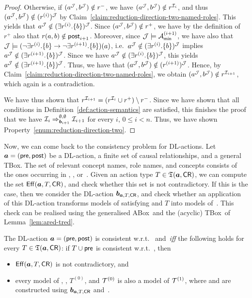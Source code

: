 \begin{proof}
    Otherwise, if $(a^\mathcal{J},b^\mathcal{J})\notin r^-$, we have
    $(a^\mathcal{J},b^\mathcal{J})\notin r^{\mathcal{I}_i}$, and thus
    $(a^\mathcal{J},b^\mathcal{J})\notin(r^{(i)})^\mathcal{J}$ by
    Claim~\ref{claim:reduction-direction-two-named-roles}.  This yields that
    $a^\mathcal{J}\notin(\exists r^{(i)}.\{b\})^\mathcal{J}$.  Since
    $(a^\mathcal{J},b^\mathcal{J})\notin r^+$, we have by the definition of~$r^+$ also that
    $r(a,b)\notin\mathsf{post}_{i+1}$.  Moreover, since $\mathcal{J}\models\mathcal{A}_\mathsf{min}^{(i+1)}$, we
    have also that
    $\mathcal{J}\models(\lnot\exists r^{(i)}.\{b\}\to\lnot\exists r^{(i+1)}.\{b\})(a)$,
    i.e.~$a^\mathcal{J}\notin(\exists r^{(i)}.\{b\})^\mathcal{J}$ implies
    $a^\mathcal{J}\notin(\exists r^{(i+1)}.\{b\})^\mathcal{J}$.  Since we have
    $a^\mathcal{J}\notin(\exists r^{(i)}.\{b\})^\mathcal{J}$, this yields
    $a^\mathcal{J}\notin(\exists r^{(i+1)}.\{b\})^\mathcal{J}$.  Thus, we have that
    $(a^\mathcal{J},b^\mathcal{J})\notin(r^{(i+1)})^\mathcal{J}$.  Hence, by
    Claim~\ref{claim:reduction-direction-two-named-roles}, we obtain
    $(a^\mathcal{J},b^\mathcal{J})\notin r^{\mathcal{I}_{i+1}}$, which again is a contradiction.

    We have thus shown that
    $r^{\mathcal{I}_{i+1}}=(r^{\mathcal{I}_i}\cup r^+)\setminus r^-$.
    Since we have shown that all conditions in Definition~\ref{def:action-semantics}
    are satisfied, this finishes the proof that we have
    $\mathcal{I}_i\Rightarrow_{\boldsymbol b_{i+1}}^{\emptyset,\emptyset}\mathcal{I}_{i+1}$ for every
    $i$, $0\le i<n$.  Thus, we have shown
    Property~\eqref{enum:reduction-direction-two}.
\end{proof}

\noindent
Now, we can come back to the consistency problem for DL-actions.  Let
$\boldsymbol a=(\mathsf{pre},\mathsf{post})$ be a DL-action, \CR a finite set of causal
relationships, and \Tmc a general TBox.  The set \Rmc of relevant concept names,
role names, and concepts consists of the ones occurring in \abf, \CR, or~\Tmc.
Given an action type $T\in\mathfrak{T}(\boldsymbol a,\mathsf{CR})$, we can compute the set
$\operatorname{\mathsf{Eff}}(\boldsymbol a,T,\mathsf{CR})$, and check whether this set is not contradictory.  If this is
the case, then we consider the DL-action $\boldsymbol b_{\boldsymbol a,T,\mathsf{CR}}$, and check whether
an application of this DL-action transforms models of \Tmc satisfying \pre and
$T$ into models of~\Tmc.  This check can be realised using the generalised
ABox~\Ared and the (acyclic) TBox~\Tred of Lemma~\ref{lem:ared-tred}.

\begin{lemma}\label{lem:consistency-tbox}
    The DL-action $\boldsymbol a=(\mathsf{pre},\mathsf{post})$ is consistent w.r.t.~\Tmc
    and~\CR \emph{iff} the following holds for every $T\in\mathfrak{T}(\boldsymbol a,\mathsf{CR})$: if
    $T\cup\mathsf{pre}$ is consistent w.r.t.~\Tmc, then
    \begin{itemize}
        \item $\operatorname{\mathsf{Eff}}(\boldsymbol a,T,\mathsf{CR})$ is not contradictory, and
        \item every model of \Ared, \Tred, $T^{(0)}$, and $\mathcal{T}^{(0)}$ is also a
            model of $\mathcal{T}^{(1)}$, where \Ared and \Tred are constructed using
            $\boldsymbol b_{\boldsymbol a,T,\mathsf{CR}}$ and~\Rmc.
    \end{itemize}
\end{lemma}


